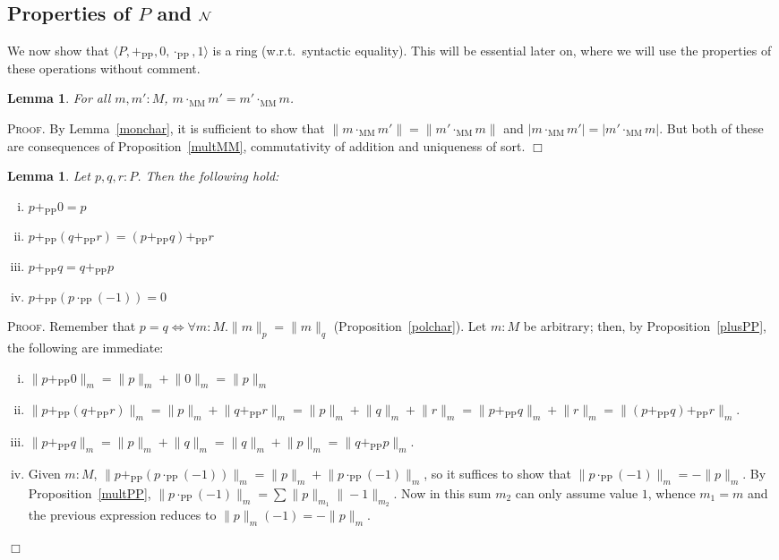 \documentclass{article}
\newtheorem{lemma}[definition]{Lemma}
\newenvironment{proof}{\smallskip\textsc{Proof.}}{\hspace*{\fill}$\Box$}
\newcommand{\N}{{\cal N}}
\newcommand{\coeff}[2]{\ensuremath{\|#2\|_{#1}}}
\newcommand{\multMM}{\ensuremath{\cdot_{\mathrm{MM}}}}
\newcommand{\plusPP}{\ensuremath{+_{\mathrm{PP}}}}
\newcommand{\multPP}{\ensuremath{\cdot_{\mathrm{PP}}}}
\begin{document}
\subsection{Properties of $P$ and $\N$}\label{PNprops}

We now show that $\langle P,\plusPP,0,\multPP,1\rangle$ is a ring
(w.r.t.\ syntactic equality).
This will be essential later on, where we will use the properties
of these operations without comment.

\begin{lemma}\label{multMMcomm}
For all $m,m':M$, $m\multMM m'=m'\multMM m$.
\end{lemma}
\begin{proof}
By Lemma~\ref{monchar}, it is sufficient to show that 
$\|m\multMM m'\|=\|m'\multMM m\|$ and $|m\multMM m'|=|m'\multMM m|$.  But
both of these are consequences of Proposition~\ref{multMM}, commutativity
of addition and uniqueness of sort.
\end{proof}

\begin{lemma}\label{plusPPprops}
Let $p,q,r:P$.  Then the following hold:
\begin{enumerate}[(i)]
\item $p\plusPP0=p$
\item $p\plusPP (q\plusPP r)=(p\plusPP q)\plusPP r$
\item $p\plusPP q=q\plusPP p$
\item $p\plusPP (p\multPP(-1))=0$
\end{enumerate}
\end{lemma}
\begin{proof} Remember that $p=q\iff \forall m:M.\coeff pm=\coeff qm$
(Proposition~\ref{polchar}).  Let $m:M$ be arbitrary; then, by
Proposition~\ref{plusPP}, the following are immediate:
\begin{enumerate}[(i)]
\item 
 $\coeff m{p\plusPP0}%
=\coeff mp+\coeff m0%
=\coeff mp$
\item
 $\coeff m{p\plusPP (q\plusPP r)}%
=\coeff mp+\coeff m{q\plusPP r}%
=\coeff mp+\coeff mq+\coeff mr%
=\coeff m{p\plusPP q}+\coeff mr%
=\coeff m{(p\plusPP q)\plusPP r}$.
\item
 $\coeff m{p\plusPP q}%
=\coeff mp+\coeff mq%
=\coeff mq+\coeff mp%
=\coeff m{q\plusPP p}$.
\item Given $m:M$,
$\coeff m{p\plusPP(p\multPP(-1))}=\coeff mp+\coeff m{p\multPP(-1)}$, so
it suffices to show that $\coeff m{p\multPP(-1)}=-\coeff mp$.
By Proposition~\ref{multPP},
$\coeff m{p\multPP(-1)}=\sum\coeff{m_1}p\coeff{m_2}{-1}$.
Now in this sum $m_2$ can only assume value $1$, whence $m_1=m$ and
the previous expression reduces to $\coeff mp(-1)=-\coeff mp$.
\end{enumerate}
\end{proof}
\end{document}

